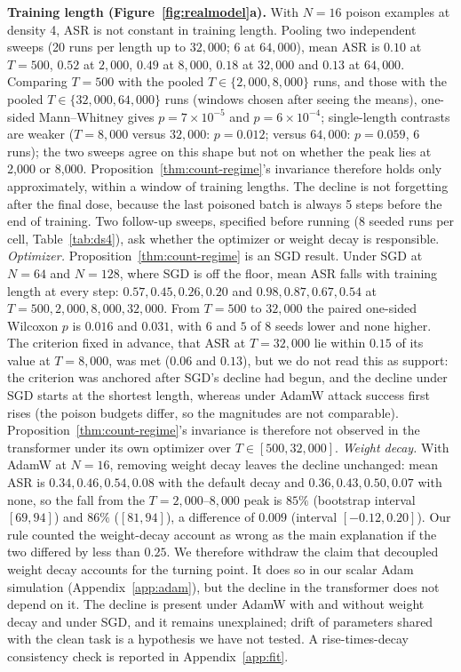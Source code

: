 \documentclass{article} %
\begin{document}
\textbf{Training length (Figure~\ref{fig:realmodel}a).} With $N=16$ poison examples
at density 4, ASR is not constant in training length. Pooling two independent sweeps
(20 runs per length up to $32{,}000$; 6 at $64{,}000$), mean ASR is $0.10$ at
$T=500$, $0.52$ at $2{,}000$, $0.49$ at $8{,}000$, $0.18$ at $32{,}000$ and $0.13$ at
$64{,}000$. Comparing $T=500$ with the pooled $T\in\{2{,}000,8{,}000\}$ runs, and those with the pooled $T\in\{32{,}000,64{,}000\}$ runs (windows chosen after seeing the means), one-sided Mann--Whitney gives $p=7\times10^{-5}$ and $p=6\times10^{-4}$; single-length contrasts are weaker ($T=8{,}000$ versus $32{,}000$: $p=0.012$; versus $64{,}000$: $p=0.059$, 6 runs); the two sweeps agree on this shape but not
on whether the peak lies at 2{,}000 or 8{,}000. Proposition~\ref{thm:count-regime}'s
invariance therefore holds only approximately, within a window of training lengths. The decline is not forgetting after the final dose, because the last poisoned batch is always 5 steps before the end of training.
Two follow-up sweeps, specified before running (8 seeded runs per cell, Table~\ref{tab:ds4}),
ask whether the optimizer or weight decay is responsible. \emph{Optimizer.} Proposition~\ref{thm:count-regime} is an SGD result. Under SGD at $N=64$ and $N=128$, where SGD is off the floor, mean ASR falls with training length at every step: $0.57, 0.45, 0.26, 0.20$ and $0.98, 0.87, 0.67, 0.54$ at $T=500, 2{,}000, 8{,}000, 32{,}000$. From $T=500$ to $32{,}000$ the paired one-sided Wilcoxon $p$ is $0.016$ and $0.031$, with $6$ and $5$ of $8$ seeds lower and none higher. The criterion fixed in advance, that ASR at $T=32{,}000$ lie within $0.15$ of its value at $T=8{,}000$, was met ($0.06$ and $0.13$), but we do not read this as support: the criterion was anchored after SGD's decline had begun, and the decline under SGD starts at the shortest length, whereas under AdamW attack success first rises (the poison budgets differ, so the magnitudes are not comparable). Proposition~\ref{thm:count-regime}'s invariance is therefore not observed in the transformer under its own optimizer over $T\in[500,32{,}000]$. \emph{Weight decay.} With AdamW at $N=16$, removing weight decay leaves the decline unchanged: mean ASR is $0.34, 0.46, 0.54, 0.08$ with the default decay and $0.36, 0.43, 0.50, 0.07$ with none, so the fall from the $T=2{,}000$--$8{,}000$ peak is $85\%$ (bootstrap interval $[69,94]$) and $86\%$ ($[81,94]$), a difference of $0.009$ (interval $[-0.12,0.20]$). Our rule counted the weight-decay account as wrong as the main explanation if the two differed by less than $0.25$. We therefore withdraw the claim that decoupled weight decay accounts for the turning point. It does so in our scalar Adam simulation (Appendix~\ref{app:adam}), but the decline in the transformer does not depend on it. The decline is present under AdamW with and without weight decay and under SGD, and it remains unexplained; drift of parameters shared with the clean task is a hypothesis we have not tested. A rise-times-decay consistency check is reported in Appendix~\ref{app:fit}.
\end{document}
